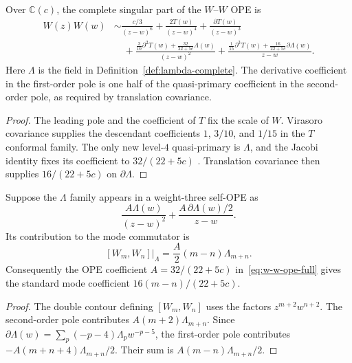 \begin{theorem}
\label{thm:w-w-ope-complete}
Over $\mathbb C(c)$, the complete singular part of the $W$--$W$ OPE
is
\begin{align}
W(z)W(w)
&\sim \frac{c/3}{(z-w)^6}
+\frac{2T(w)}{(z-w)^4}
+\frac{\partial T(w)}{(z-w)^3}\nonumber\\
&\quad
+\frac{\frac{3}{10}\partial^2T(w)
       +\frac{32}{22+5c}\Lambda(w)}{(z-w)^2}
+\frac{\frac{1}{15}\partial^3T(w)
       +\frac{16}{22+5c}\partial\Lambda(w)}{z-w}.
\label{eq:w-w-ope-full}
\end{align}
Here $\Lambda$ is the field in
Definition~\ref{def:lambda-complete}.  The derivative coefficient in
the first-order pole is one half of the quasi-primary coefficient in
the second-order pole, as required by translation covariance.
\end{theorem}

\begin{proof}
The leading pole and the coefficient of $T$ fix the scale of $W$.
Virasoro covariance supplies the descendant coefficients
$1$, $3/10$, and $1/15$ in the $T$ conformal family.  The only new
level-$4$ quasi-primary is $\Lambda$, and the Jacobi identity fixes
its coefficient to $32/(22+5c)$
\cite{Zamolodchikov,Bouwknegt-Schoutens}.  Translation covariance
then supplies $16/(22+5c)$ on $\partial\Lambda$.
\end{proof}

\begin{proposition}
\label{prop:w3-ope-mode-normalization}
Suppose the $\Lambda$ family appears in a weight-three self-OPE as
\[
\frac{A\Lambda(w)}{(z-w)^2}
+\frac{A\,\partial\Lambda(w)/2}{z-w}.
\]
Its contribution to the mode commutator is
\begin{equation}\label{eq:ope-to-mode-half}
[W_m,W_n]\big|_\Lambda
=\frac{A}{2}(m-n)\Lambda_{m+n}.
\end{equation}
Consequently the OPE coefficient
$A=32/(22+5c)$ in~\eqref{eq:w-w-ope-full} gives the standard mode
coefficient $16(m-n)/(22+5c)$.
\end{proposition}

\begin{proof}
The double contour defining $[W_m,W_n]$ uses the factors
$z^{m+2}w^{n+2}$.  The second-order pole contributes
$A(m+2)\Lambda_{m+n}$.  Since
$\partial\Lambda(w)=\sum_p(-p-4)\Lambda_pw^{-p-5}$, the first-order
pole contributes $-A(m+n+4)\Lambda_{m+n}/2$.  Their sum is
$A(m-n)\Lambda_{m+n}/2$.
\end{proof}

